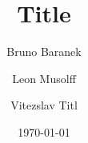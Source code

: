 \documentclass[12pt,american]{scrartcl}
\title{Title}
\author{Bruno Baranek \and Leon Musolff \and Vitezslav Titl}
\date{\today}
\begin{document}

\newpage



\editor


\reviewer



%
%
\end{document}
